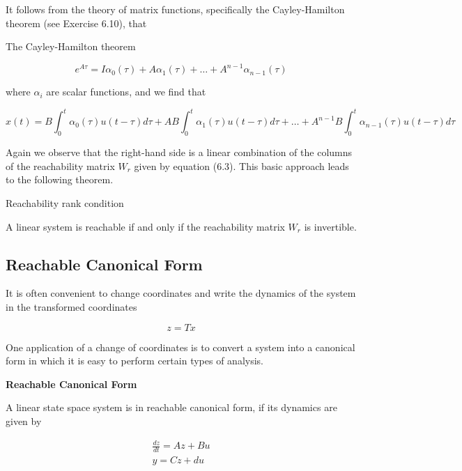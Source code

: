 It follows from the theory of matrix functions, specifically the Cayley-Hamilton
theorem (see Exercise 6.10), that


\begin{framed}
\theoremstyle{remark}
\begin{remark}{The Cayley-Hamilton theorem}

\end{remark}
\end{framed}

\begin{equation}
e^{A\tau}  = I\alpha_0(\tau) + A\alpha_1(\tau) + \dots + A^{n-1}\alpha_{n-1}(\tau)
\end{equation}

where $\alpha_i$ are scalar functions, and we find that 

\begin{equation}
x(t)  = B\int_{0}^{t} \alpha_0(\tau)u(t-\tau)d\tau + AB\int_{0}^{t} \alpha_1(\tau)u(t-\tau)d\tau+ \dots + A^{n-1}B\int_{0}^{t} \alpha_{n-1}(\tau)u(t-\tau)d\tau  
\end{equation}

Again we observe that the right-hand side is a linear combination of the columns
of the reachability matrix $W_r$ given by equation (6.3). This basic approach leads to
the following theorem.

\begin{framed}
\theoremstyle{theorem}
\begin{theorem}{Reachability rank condition}

 A linear system is reachable if and
only if the reachability matrix $W_r$ is invertible.
\end{theorem}
\end{framed}


\subsection{Reachable Canonical Form}

It is often convenient to change coordinates and write the dynamics of the system in the transformed coordinates

\begin{equation}
z = Tx
\end{equation}

One application of a change of coordinates is to convert a system into a
canonical form in which it is easy to perform certain types of analysis.

\begin{framed}
\theoremstyle{remark}
\begin{remark}{\textbf{Reachable Canonical Form}}

A linear state space system is in reachable canonical form, if its dynamics are given by

\begin{eqnarray}
\frac{dz}{dt} = Az + Bu \\
y=Cz + du
\end{eqnarray}

\end{remark}
\end{framed}

